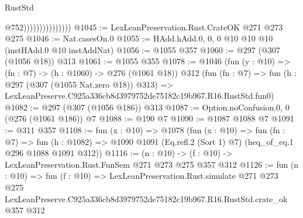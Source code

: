 \begin{lexlean}{RustStd}
\begin{coremodule}
                                  @752)))))))))))))))
@1045 := LexLeanPreservation.Rust.CrateOK @271 @273 @275
@1046 := Nat.casesOn.{0}
@1055 := HAdd.hAdd.{0, 0, 0} @10 @10 @10 (instHAdd.{0} @10 instAddNat)
@1056 := @1055 @357
@1060 := @297 (@307 (@1056 @18)) @313
@1061 := @1055 @355
@1078 := @1046
    (fun (y : @10) => (fn : @7) -> (h : @1060) -> @276 (@1061 @18))
    @312
    (fun (fn : @7) =>
    fun (h : @297 (@307 (@1055 Nat.zero @18)) @313) =>
    LexLeanPreserve.C925a336cb8d3979752de75182c19b967.R16.RustStd.fun0)
@1082 := @297 (@307 (@1056 @186)) @313
@1087 := Option.noConfusion.{0, 0} (@276 (@1061 @186)) @7
@1088 := @190 @7
@1090 := @1087 @1088 @7
@1091 := @311 @357
@1108 := fun (x : @10) =>
  @1078
    (fun (x : @10) =>
    fun (fn : @7) =>
    fun (h : @1082) => @1090 @1091 (Eq.refl.{2} (Sort 1) @7) (heq_of_eq.{1} @296 @1088 @1091 @312))
@1116 := (n : @10) -> (f : @10) -> LexLeanPreservation.Rust.FunSem @271 @273 @275 @357 @312
@1126 := fun (n : @10) =>
  fun (f : @10) =>
  LexLeanPreservation.Rust.simulate
    @271
    @273
    @275
    LexLeanPreserve.C925a336cb8d3979752de75182c19b967.R16.RustStd.crate_ok
    @357
    @312
\end{coremodule}
\end{lexlean}

